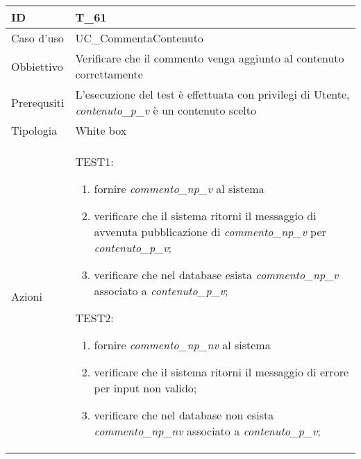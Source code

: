 \begin{table}[hb]
    \centering
    \begin{tabular}{ |p{2cm}|p{10cm}|  }
        \hline
        ID          & T\_61                                                              \\\hline
        Caso d'uso  & UC\_CommentaContenuto                                             \\\hline
        Obbiettivo  & Verificare che il commento venga aggiunto al contenuto correttamente \\\hline
        Prerequsiti & L'esecuzione del test è effettuata con privilegi di Utente, \emph{contenuto\_p\_v} 
        è un contenuto scelto \\\hline
        Tipologia   & White box                                                          \\\hline
        Azioni      &
        TEST1:
        \begin{enumerate}[nosep, topsep=0pt]
            \item fornire \emph{commento\_np\_v} al sistema
            \item verificare che il sistema ritorni il messaggio di avvenuta pubblicazione 
            di \emph{commento\_np\_v} per \emph{contenuto\_p\_v};
            \item verificare che nel database esista \emph{commento\_np\_v} associato a 
            \emph{contenuto\_p\_v};
        \end{enumerate}
        \vspace{0.5cm} TEST2:
        \begin{enumerate}[nosep, topsep=0pt]
            \item fornire \emph{commento\_np\_nv} al sistema
            \item verificare che il sistema ritorni il messaggio di errore per input non valido;
            \item verificare che nel database non esista \emph{commento\_np\_nv} associato a 
            \emph{contenuto\_p\_v};
        \end{enumerate}
        \\\hline
    \end{tabular}
\end{table}

